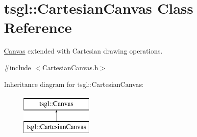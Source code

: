 \hypertarget{classtsgl_1_1_cartesian_canvas}{\section{tsgl\-:\-:Cartesian\-Canvas Class Reference}
\label{classtsgl_1_1_cartesian_canvas}
}


\hyperlink{classtsgl_1_1_canvas}{Canvas} extended with Cartesian drawing operations.  




{\ttfamily \#include $<$Cartesian\-Canvas.\-h$>$}

Inheritance diagram for tsgl\-:\-:Cartesian\-Canvas\-:\begin{figure}[H]
\begin{center}
\leavevmode
\includegraphics[height=2.000000cm]{classtsgl_1_1_cartesian_canvas}
\end{center}
\end{figure}
